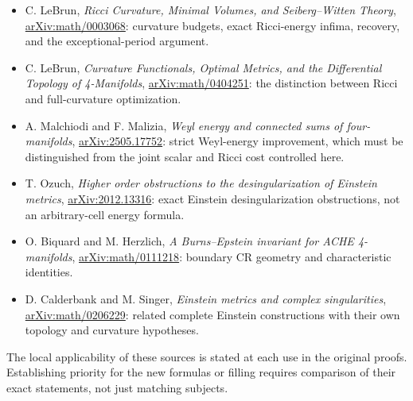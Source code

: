\documentclass[
]{article}
\providecommand{\tightlist}{%
  \setlength{\itemsep}{0pt}\setlength{\parskip}{0pt}}
\begin{document}
\begin{itemize}
\tightlist
\item
  C. LeBrun, \emph{Ricci Curvature, Minimal Volumes, and Seiberg--Witten
  Theory},
  \href{https://arxiv.org/abs/math/0003068}{arXiv:math/0003068}:
  curvature budgets, exact Ricci-energy infima, recovery, and the
  exceptional-period argument.
\item
  C. LeBrun, \emph{Curvature Functionals, Optimal Metrics, and the
  Differential Topology of 4-Manifolds},
  \href{https://arxiv.org/abs/math/0404251}{arXiv:math/0404251}: the
  distinction between Ricci and full-curvature optimization.
\item
  A. Malchiodi and F. Malizia, \emph{Weyl energy and connected sums of
  four-manifolds},
  \href{https://arxiv.org/abs/2505.17752}{arXiv:2505.17752}: strict
  Weyl-energy improvement, which must be distinguished from the joint
  scalar and Ricci cost controlled here.
\item
  T. Ozuch, \emph{Higher order obstructions to the desingularization of
  Einstein metrics},
  \href{https://arxiv.org/abs/2012.13316}{arXiv:2012.13316}: exact
  Einstein desingularization obstructions, not an arbitrary-cell energy
  formula.
\item
  O. Biquard and M. Herzlich, \emph{A Burns--Epstein invariant for ACHE
  4-manifolds},
  \href{https://arxiv.org/abs/math/0111218}{arXiv:math/0111218}:
  boundary CR geometry and characteristic identities.
\item
  D. Calderbank and M. Singer, \emph{Einstein metrics and complex
  singularities},
  \href{https://arxiv.org/abs/math/0206229}{arXiv:math/0206229}: related
  complete Einstein constructions with their own topology and curvature
  hypotheses.
\end{itemize}

The local applicability of these sources is stated at each use in the
original proofs. Establishing priority for the new formulas or filling
requires comparison of their exact statements, not just matching
subjects.
\end{document}
